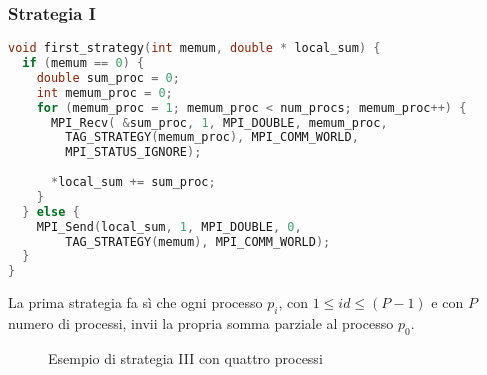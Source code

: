 \documentclass[a4paper,11pt]{book}
\begin{document}
\subsubsection{Strategia I}
\begin{lstlisting}[language=C]
void first_strategy(int memum, double * local_sum) {
  if (memum == 0) {
    double sum_proc = 0;
    int memum_proc = 0;
    for (memum_proc = 1; memum_proc < num_procs; memum_proc++) {
      MPI_Recv( &sum_proc, 1, MPI_DOUBLE, memum_proc,
        TAG_STRATEGY(memum_proc), MPI_COMM_WORLD,
        MPI_STATUS_IGNORE);
        
      *local_sum += sum_proc;
    }
  } else {
    MPI_Send(local_sum, 1, MPI_DOUBLE, 0,
        TAG_STRATEGY(memum), MPI_COMM_WORLD);
  }
}
\end{lstlisting}
La prima strategia fa sì che ogni processo $p_i$, con $1 \leq id \leq (P-1)$ e con $P$ numero di processi, invii la propria somma parziale al processo $p_0$.
\begin{figure}[H]
\centering
    \caption{Esempio di strategia III con quattro processi}
    \label{fig:grid files}
\end{figure}
\end{document}
